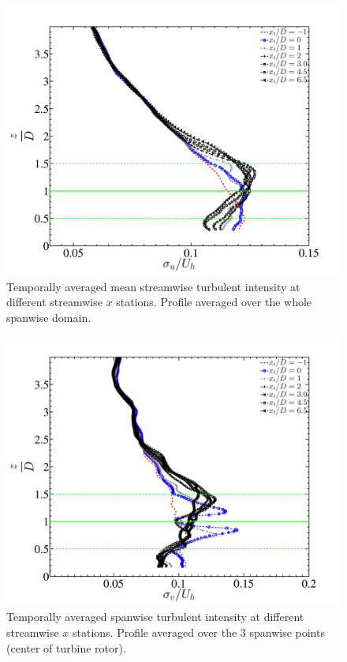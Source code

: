 \begin{figure}
\centering
\includegraphics[width = 0.8\linewidth]{stats/ufluc_Npoints_avg.pdf}
\caption[Mean $\sigma_{u}$ at $x$ stations 3]{Temporally averaged mean streamwise turbulent intensity at different streamwise $x$ stations. Profile averaged over the whole spanwise domain.}\label{fig:ustat3}
\end{figure}
\begin{figure}
\centering
\includegraphics[width = 0.8\linewidth]{stats/vfluc_3points_avg.pdf}
\caption[Mean $\sigma_{v}$ at $x$ stations 1]{Temporally averaged spanwise turbulent intensity at different streamwise $x$ stations. Profile averaged over the  3 spanwise points (center of turbine rotor).}\label{fig:vstat1}
\end{figure}
